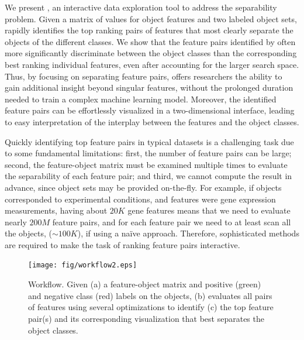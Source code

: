We present \genviz,
an interactive data exploration tool to address the separability problem.
Given a matrix of values for object features
and two labeled object sets, \genviz rapidly identifies
the top ranking pairs of features
that most clearly separate the objects of
the different classes.
We show that the feature pairs identified by \genviz often more significantly
discriminate between the object classes than the corresponding
best ranking individual features, even after accounting for the larger search space.
Thus, by focusing on separating feature pairs, \genviz
offers researchers the ability to gain additional
insight beyond singular features, without the prolonged duration
needed to train a complex machine learning model.
Moreover, the identified feature pairs can be effortlessly
visualized in a two-dimensional interface,
leading to easy interpretation of
the interplay between the features and the object classes.

Quickly identifying top feature pairs
in typical datasets
is a challenging task due to some fundamental limitations:
first, the number of feature pairs can be large;
second, the feature-object matrix must be examined
multiple times to evaluate the separability of
each feature pair;
and third, we cannot compute the result in advance, since
object sets may be provided on-the-fly.
For example, if objects corresponded to experimental
conditions, and features were gene expression measurements,
having about $20K$ gene features
means that we need to evaluate nearly $200M$ feature pairs,
and for each feature pair we need to at least scan all the objects,
($\sim100K$), if using a na\"ive approach.
Therefore, sophisticated methods are required
to make the task of ranking feature pairs interactive.

\begin{figure}[t]
 \centering
 \texttt{[image: fig/workflow2.eps]}
 \vspace{-10pt}
\caption{\genviz Workflow.
Given (a) a feature-object matrix and positive (green) and negative class (red) labels on the objects, \genviz (b) evaluates all pairs of features using several optimizations to identify (c) the top feature pair(s) and its corresponding visualization that best separates the object classes.}
\label{fig:workflow}
\vspace{-15pt}
\end{figure}


